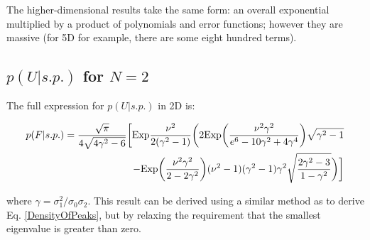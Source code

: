 \documentclass[12pt]{article}
\begin{document}
The higher-dimensional results take the same form: an overall exponential multiplied by a product of polynomials and error functions; however they are massive (for 5D for example, there are some eight hundred terms).

\subsection{$p(U|s.p.)$ for $N=2$}
The full expression for $p(U|s.p.)$ in 2D is:

\begin{equation}
\begin{split}
p(F|s.p.)=\frac{\sqrt{\pi}}{4\sqrt{4\gamma^2-6}}\bigg{[}\mathrm{Exp}\frac{\nu^2}{2(\gamma^2-1)}\bigg{(}2\mathrm{Exp}\bigg{(}\frac{\nu^2\gamma^2}{e^6-10\gamma^2+4\gamma^4}\bigg{)}\sqrt{\gamma^2-1}\\
-\mathrm{Exp}\bigg{(}\frac{\nu^2\gamma^2}{2-2\gamma^2}\bigg{)}(\nu^2-1)(\gamma^2-1)\gamma^2\sqrt{\frac{2\gamma^2-3}{1-\gamma^2}}\bigg{)}\bigg{]}
\end{split}
\end{equation}

\noindent where $\gamma = \sigma_1^2/\sigma_0\sigma_2$. This result can be derived using a similar method as to derive Eq. \ref{DensityOfPeaks}, but by relaxing the requirement that the smallest eigenvalue is greater than zero.
\end{document}
